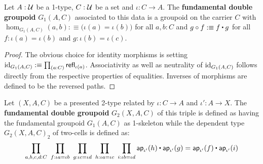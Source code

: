 \begin{defn} Let $A : \mathcal{U}$ be a 1-type, $C : \mathcal{U}$ be a set
and $\iota : C \to A$. The \textbf{fundamental double groupoid} $G_1(A,C)$ 
associated to this data is a groupoid on the carrier $C$ with
$\hom_{G_1(A,C)}(a,b) :\equiv \big(\iota(a) = \iota(b)\big)$ for all $a,b:C$ and
$g \circ f :\equiv f \ct g$ for all $f : \iota(a) = \iota(b)$ and $g : \iota(b)
= \iota(c)$.
\end{defn}

\begin{proof}
The obvious choice for identity morphisms is setting $\operatorname{id}_{G_1(A,C)} :\equiv
\prod_{(a:C)} \mathsf{refl}_{\iota(a)}$. Associativity as well as neutrality of $\operatorname{id}_{G_1(A,C)}$
follows directly from the respective properties of equalities. %
Inverses of morphisms are defined to be the reversed paths.
\end{proof}

\begin{defn}
Let $(X,A,C)$ be a presented 2-type related by $\iota : C \to A$ and $\iota' :
A \to X$. The \textbf{fundamental double groupoid} $G_2(X,A,C)$ of this triple
is defined as having the fundamental groupoid $G_1(A,C)$ as 1-skeleton while the
dependent type $G_2(X,A,C)_2$ of two-cells is defined as:
\begin{equation}
\prod_{a,b,c,d:C} ~ \prod_{f : \iota a = \iota b} ~ \prod_{g : \iota c = \iota d}
	~ \prod_{h : \iota a = \iota c} ~ \prod_{i : \iota b = \iota d}
	\apiop(h) \ct \apiop(g) = \apiop(f) \ct \apiop(i)
\end{equation}
\end{defn}

